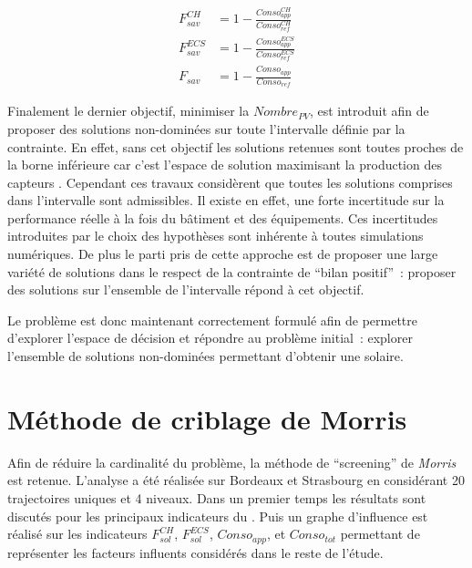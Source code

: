 \begin{align}\label{eq:taux_economie_opti}
  F_{sav}^{CH}   &= 1 - \frac{Conso_{app}^{CH}}{Conso_{ref}^{CH}} \\
  F_{sav}^{ECS}  &= 1 - \frac{Conso_{app}^{ECS}}{Conso_{ref}^{ECS}} \\
  F_{sav}        &= 1 - \frac{Conso_{app}}{Conso_{ref}}
\end{align}

Finalement le dernier objectif, minimiser la $Nombre_{PV}$, est introduit afin de proposer
des solutions non-dominées sur toute l’intervalle définie par la contrainte. En effet,
sans cet objectif les solutions retenues sont toutes proches de la borne inférieure car
c’est l’espace de solution maximisant la production des capteurs . Cependant ces
travaux considèrent que toutes les solutions comprises dans l’intervalle sont admissibles.
Il existe en effet, une forte incertitude sur la performance réelle à la fois du bâtiment
et des équipements. Ces incertitudes introduites par le choix des hypothèses sont
inhérente à toutes simulations numériques. De plus le parti pris de cette approche est de
proposer une large variété de solutions dans le respect de la contrainte de \enquote{bilan
positif}~: proposer des solutions sur l’ensemble de l’intervalle répond à cet objectif.

Le problème est donc maintenant correctement formulé afin de permettre d’explorer l’espace
de décision et répondre au problème initial~: explorer l’ensemble de solutions non-dominées
permettant d’obtenir une  solaire.



\section{Méthode de criblage de Morris} %
\label{sec:methode_criblage_de_morris}
Afin de réduire la cardinalité du problème, la méthode de \enquote{screening} de
\textit{Morris} est retenue. L’analyse a été réalisée sur Bordeaux et Strasbourg en
considérant \num{20} trajectoires uniques et \num{4} niveaux. Dans un premier temps les
résultats sont discutés pour les principaux indicateurs du . Puis un graphe
d’influence est réalisé sur les indicateurs $F_{sol}^{CH}$, $F_{sol}^{ECS}$,
$Conso_{app}$, et $Conso_{tot}$ permettant de représenter les facteurs influents
considérés dans le reste de l’étude.

